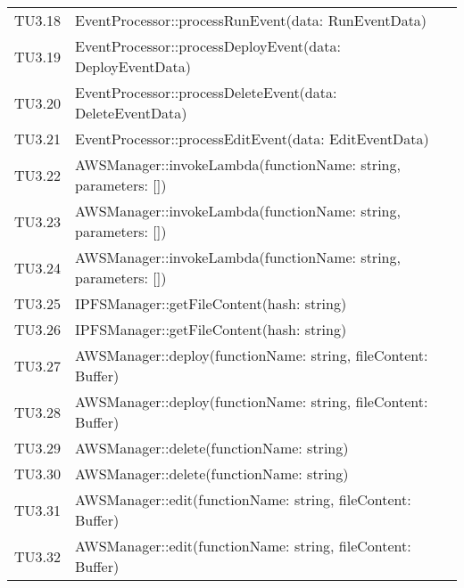 \begin{longtable}{
		>{\centering}p{}
		>{\centering\arraybackslash}p{}}
	TU3.18 & EventProcessor::processRunEvent(data: RunEventData) \\
	
	TU3.19 & EventProcessor::processDeployEvent(data: DeployEventData) \\
	
	TU3.20 & EventProcessor::processDeleteEvent(data: DeleteEventData) \\
	
	TU3.21 & EventProcessor::processEditEvent(data: EditEventData) \\
	
	TU3.22 & AWSManager::invokeLambda(functionName: string, parameters: []) \\
	
	TU3.23 & AWSManager::invokeLambda(functionName: string, parameters: []) \\
	
	TU3.24 & AWSManager::invokeLambda(functionName: string, parameters: []) \\
	
	TU3.25 & IPFSManager::getFileContent(hash: string) \\
	
	TU3.26 & IPFSManager::getFileContent(hash: string) \\
	
	TU3.27 & AWSManager::deploy(functionName: string, fileContent: Buffer) \\
	
	TU3.28 & AWSManager::deploy(functionName: string, fileContent: Buffer) \\
	
	TU3.29 & AWSManager::delete(functionName: string) \\
	
	TU3.30 & AWSManager::delete(functionName: string) \\
	
	TU3.31 & AWSManager::edit(functionName: string, fileContent: Buffer) \\
	
	TU3.32 & AWSManager::edit(functionName: string, fileContent: Buffer) \\

\end{longtable}
